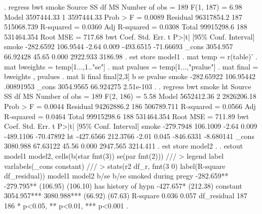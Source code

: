 . regress bwt smoke 
{\smallskip}
      Source {\VBAR}       SS           df       MS      Number of obs   =       189
   F(1, 187)       =      6.98
       Model {\VBAR}  3597444.33         1  3597444.33   Prob > F        =    0.0089
    Residual {\VBAR}  96317854.2       187  515068.739   R-squared       =    0.0360
   Adj R-squared   =    0.0308
       Total {\VBAR}  99915298.6       188  531464.354   Root MSE        =    717.68
{\smallskip}
         bwt {\VBAR}      Coef.   Std. Err.      t    P>|t|     [95\% Conf. Interval]
       smoke {\VBAR}  -282.6592   106.9544    -2.64   0.009    -493.6515   -71.66693
       _cons {\VBAR}   3054.957   66.92428    45.65   0.000     2922.933     3186.98
{\smallskip}
. est store model1
{\smallskip}
. mat temp = r(table)'
{\smallskip}
. mat bweights = temp[1...,1.."se"]
{\smallskip}
. mat pvalues = temp[1...,"pvalue"]
{\smallskip}
. mat final = bweights , pvalues
{\smallskip}
. mat li final
{\smallskip}
final[2,3]
                b          se      pvalue
smoke  -282.65922   106.95442   .00891953
_cons   3054.9565   66.924275   2.51e-103
{\smallskip}
. 
. regress bwt smoke ht
{\smallskip}
      Source {\VBAR}       SS           df       MS      Number of obs   =       189
   F(2, 186)       =      5.58
       Model {\VBAR}  5652412.36         2  2826206.18   Prob > F        =    0.0044
    Residual {\VBAR}  94262886.2       186  506789.711   R-squared       =    0.0566
   Adj R-squared   =    0.0464
       Total {\VBAR}  99915298.6       188  531464.354   Root MSE        =    711.89
{\smallskip}
         bwt {\VBAR}      Coef.   Std. Err.      t    P>|t|     [95\% Conf. Interval]
       smoke {\VBAR}  -279.7948   106.1009    -2.64   0.009    -489.1106   -70.47892
          ht {\VBAR}  -427.6566   212.3766    -2.01   0.045    -846.6331   -8.680141
       _cons {\VBAR}   3080.988   67.63122    45.56   0.000     2947.565    3214.411
{\smallskip}
. est store model2
{\smallskip}
. 
. estout model1 model2, cells(b(star fmt(3)) se(par fmt(2))) ///
>   legend label varlabels(_cons constant) ///
>   stats(r2 df_r, fmt(3 0) label(R-square df_residual))
{\smallskip}
                           model1          model2   
                             b/se            b/se   
smoked during preg{\tytilde}y     -282.659**      -279.795** 
                         (106.95)        (106.10)   
has history of hyp{\tytilde}n                     -427.657*  
                                         (212.38)   
constant                 3054.957***     3080.988***
                          (66.92)         (67.63)   
R-square                    0.036           0.057   
df_residual                   187             186   
* p<0.05, ** p<0.01, *** p<0.001
{\smallskip}
.   
